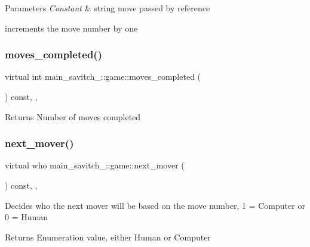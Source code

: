\begin{DoxyParams}{Parameters}
{\em Constant} & string move passed by reference\\
\hline
\end{DoxyParams}
increments the move number by one \mbox{\label{classmain__savitch__14_1_1game_a31dd5382cc6d64a6d58bcee55383cf1b}} 
\subsubsection{\texorpdfstring{moves\+\_\+completed()}{moves\_completed()}}
{\footnotesize\ttfamily virtual int main\+\_\+savitch\+\_\+::game\+::moves\+\_\+completed (\begin{DoxyParamCaption}{ }\end{DoxyParamCaption}) const\hspace{0.3cm}{\ttfamily [inline]}, {\ttfamily [protected]}, {\ttfamily [virtual]}}

\begin{DoxyReturn}{Returns}
Number of moves completed 
\end{DoxyReturn}
\mbox{\label{classmain__savitch__14_1_1game_a4e68409618474d19742dd5f75f92f5c9}} 
\subsubsection{\texorpdfstring{next\+\_\+mover()}{next\_mover()}}
{\footnotesize\ttfamily virtual who main\+\_\+savitch\+\_\+::game\+::next\+\_\+mover (\begin{DoxyParamCaption}{ }\end{DoxyParamCaption}) const\hspace{0.3cm}{\ttfamily [inline]}, {\ttfamily [protected]}, {\ttfamily [virtual]}}

Decides who the next mover will be based on the move number, 1 = Computer or 0 = Human \begin{DoxyReturn}{Returns}
Enumeration value, either Human or Computer 
\end{DoxyReturn}
\mbox{\label{classmain__savitch__14_1_1game_a98469e89e13c73a5ee70407a2164888c}} 
